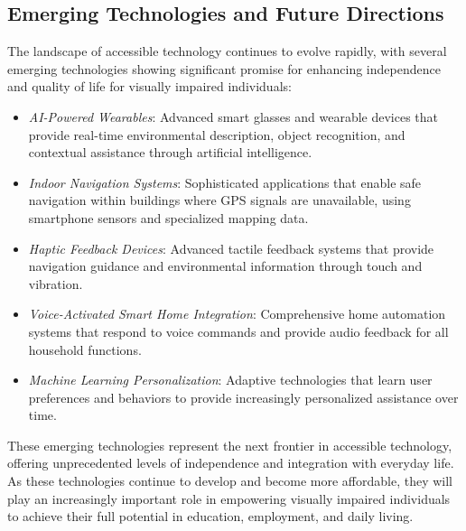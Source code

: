 \subsection{Emerging Technologies and Future Directions}\label{emerging-tech}
The landscape of accessible technology continues to evolve rapidly, with several emerging technologies showing significant promise for enhancing independence and quality of life for visually impaired individuals:

\begin{itemize}
 \item \emph{AI-Powered Wearables}: Advanced smart glasses and wearable devices that provide real-time environmental description, object recognition, and contextual assistance through artificial intelligence.
 \item \emph{Indoor Navigation Systems}: Sophisticated applications that enable safe navigation within buildings where GPS signals are unavailable, using smartphone sensors and specialized mapping data.
 \item \emph{Haptic Feedback Devices}: Advanced tactile feedback systems that provide navigation guidance and environmental information through touch and vibration.
 \item \emph{Voice-Activated Smart Home Integration}: Comprehensive home automation systems that respond to voice commands and provide audio feedback for all household functions.
 \item \emph{Machine Learning Personalization}: Adaptive technologies that learn user preferences and behaviors to provide increasingly personalized assistance over time.
\end{itemize}

These emerging technologies represent the next frontier in accessible technology, offering unprecedented levels of independence and integration with everyday life. As these technologies continue to develop and become more affordable, they will play an increasingly important role in empowering visually impaired individuals to achieve their full potential in education, employment, and daily living.
